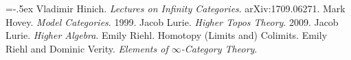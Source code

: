 \begin{thebibliography}{MMMM}
    \itemsep=-.5ex
     Vladimir Hinich. \emph{Lectures on Infinity Categories}. arXiv:1709.06271.
     Mark Hovey. \emph{Model Categories}. 1999.
     Jacob Lurie. \emph{Higher Topos Theory}. 2009.
     Jacob Lurie. \emph{Higher Algebra}.
     Emily Riehl. Homotopy (Limits and) Colimits.
     Emily Riehl and Dominic Verity. \emph{Elements of $\infty$-Category Theory}.
\end{thebibliography}
